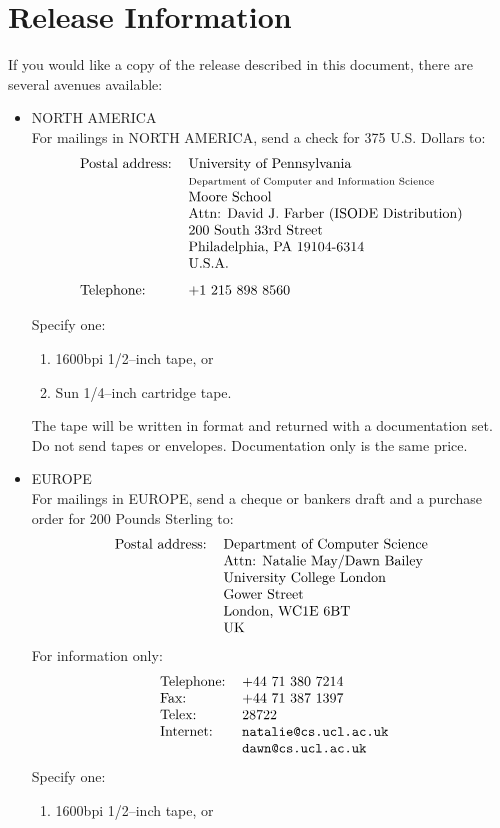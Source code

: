 \newpage\section*	{Release Information}
If you would like a copy of the release described in this document,
there are several avenues available:
\begin{itemize}
\item	NORTH AMERICA\\
For mailings in NORTH AMERICA,
send a check for 375 U.S. Dollars to:
\[\begin{tabular}{ll}
Postal address:&University of Pennsylvania\\
&		\small Department of Computer and Information Science\\
&		Moore School\\
&		Attn: David J. Farber (ISODE Distribution)\\
&		200 South 33rd Street\\
&		Philadelphia, PA 19104-6314\\
&		U.S.A.\\[0.1in]
Telephone:&	+1 215 898 8560
\end{tabular}\]

\pagebreak[3]
Specify one:
\begin{enumerate}
\item	1600bpi 1/2--inch tape, or

\item	Sun 1/4--inch cartridge tape.
\end{enumerate}
The tape will be written in  format and returned with
a documentation set.
Do not send tapes or envelopes.
Documentation only is the same price.  

\item	EUROPE\\
For mailings in EUROPE, send a cheque or bankers draft and a purchase order
for 200 Pounds Sterling to:  
\[\begin{tabular}{ll}
Postal address:&	Department of Computer Science\\
&			Attn: Natalie May/Dawn Bailey\\
&			University College London\\
&			Gower Street\\
&			London, WC1E 6BT\\
&			UK
\end{tabular}\]
For information only:
\[\begin{tabular}{ll}
\ Telephone:&		+44 71 380 7214\\
\ Fax:&			+44 71 387 1397\\
\ Telex:&		28722\\
\ Internet:&		\verb"natalie@cs.ucl.ac.uk"\\
&			\verb"dawn@cs.ucl.ac.uk"
\end{tabular}\]
Specify one:
\begin{enumerate}
\item	1600bpi 1/2--inch tape, or


\end{enumerate}
\end{itemize}
